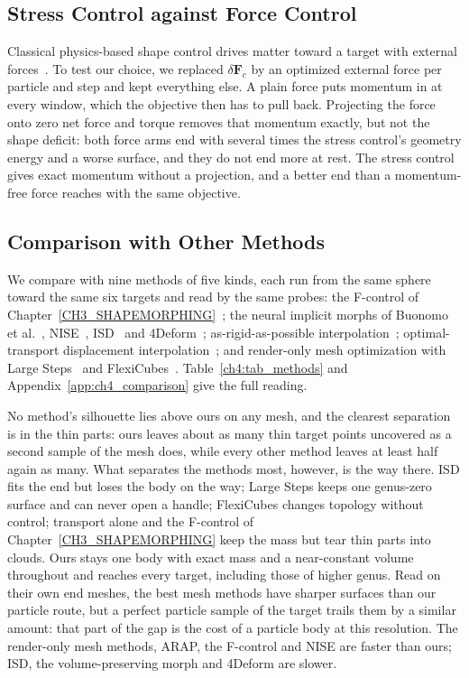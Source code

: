 \subsection{Stress Control against Force Control}
\label{ch4:sec_force}
Classical physics-based shape control drives matter toward a target with external
forces~\citep{treuille2003keyframe,2004-FluidControlAdjointMethod,10.1145/1015706.1015743,chen2024eigenfluids,li2025flowmapadjoint}.
To test our choice, we replaced $\delta\mathbf{F}_c$ by an optimized external force per particle and step and kept
everything else. A plain force puts momentum in at every window, which the objective then has to pull back. Projecting the
force onto zero net force and torque removes that momentum exactly, but not the shape deficit: both force arms end with
several times the stress control's geometry energy and a worse surface, and they do not end more at rest. The stress
control gives exact momentum without a projection, and a better end than a momentum-free force reaches with the same
objective.

\subsection{Comparison with Other Methods}
\label{ch4:sec_comparison}
We compare with nine methods of five kinds, each run from the same sphere toward the same six targets and read by the same
probes: the F-control of Chapter~\ref{CH3_SHAPEMORPHING}~\citep{11088224}; the neural implicit morphs of Buonomo et
al.~\citep{buonomo2025vpnsm}, NISE~\citep{novello2023nise}, ISD~\citep{sang2025isd} and 4Deform~\citep{sang2025fourdeform};
as-rigid-as-possible interpolation~\citep{2000-ARAPShapeInterpolation}; optimal-transport displacement
interpolation~\citep{mccann1997convexity,bonneel2011displacement}; and render-only mesh optimization with Large
Steps~\citep{nicolet2021largesteps} and FlexiCubes~\citep{shen2023flexicubes}. Table~\ref{ch4:tab_methods} and
Appendix~\ref{app:ch4_comparison} give the full reading.

No method's silhouette lies above ours on any mesh, and the clearest separation is in the thin parts: ours leaves about as
many thin target points uncovered as a second sample of the mesh does, while every other method leaves at least half
again as many. What separates the methods most, however, is the way there. ISD fits the end but loses the body on the way;
Large Steps keeps one genus-zero surface and can never open a handle; FlexiCubes changes topology without control;
transport alone and the F-control of Chapter~\ref{CH3_SHAPEMORPHING} keep the mass but tear thin parts into clouds. Ours
stays one body with exact mass and a near-constant volume throughout and reaches every target, including those of higher
genus. Read on their own end meshes, the best mesh methods have sharper surfaces than our particle route, but a perfect
particle sample of the target trails them by a similar amount: that part of the gap is the cost of a particle body at this
resolution. The render-only mesh methods, ARAP, the F-control and NISE are faster than ours; ISD, the volume-preserving
morph and 4Deform are slower.

